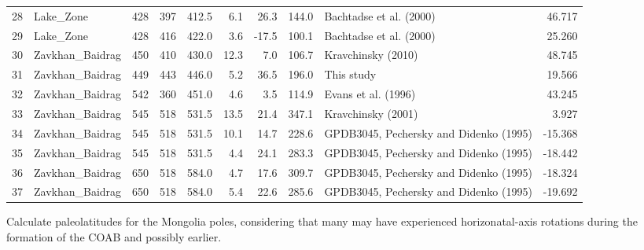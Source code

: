 \documentclass[11pt]{article}
\begin{document}
{\begin{tabular}{llrrrrrrlr}
28 &          Lake\_Zone &       428 &      397 &       412.5 &   6.1 &  26.3 &  144.0 &                 Bachtadse et al. (2000) &    46.717 \\
29 &          Lake\_Zone &       428 &      416 &       422.0 &   3.6 & -17.5 &  100.1 &                 Bachtadse et al. (2000) &    25.260 \\
30 &    Zavkhan\_Baidrag &       450 &      410 &       430.0 &  12.3 &   7.0 &  106.7 &                      Kravchinsky (2010) &    48.745 \\
31 &    Zavkhan\_Baidrag &       449 &      443 &       446.0 &   5.2 &  36.5 &  196.0 &                              This study &    19.566 \\
32 &    Zavkhan\_Baidrag &       542 &      360 &       451.0 &   4.6 &   3.5 &  114.9 &                     Evans et al. (1996) &    43.245 \\
33 &    Zavkhan\_Baidrag &       545 &      518 &       531.5 &  13.5 &  21.4 &  347.1 &                      Kravchinsky (2001) &     3.927 \\
34 &    Zavkhan\_Baidrag &       545 &      518 &       531.5 &  10.1 &  14.7 &  228.6 &  GPDB3045, Pechersky and Didenko (1995) &   -15.368 \\
35 &    Zavkhan\_Baidrag &       545 &      518 &       531.5 &   4.4 &  24.1 &  283.3 &  GPDB3045, Pechersky and Didenko (1995) &   -18.442 \\
36 &    Zavkhan\_Baidrag &       650 &      518 &       584.0 &   4.7 &  17.6 &  309.7 &  GPDB3045, Pechersky and Didenko (1995) &   -18.324 \\
37 &    Zavkhan\_Baidrag &       650 &      518 &       584.0 &   5.4 &  22.6 &  285.6 &  GPDB3045, Pechersky and Didenko (1995) &   -19.692 \\
\bottomrule
\end{tabular}}

    


    Calculate paleolatitudes for the Mongolia poles, considering that many
may have experienced horizonatal-axis rotations during the formation of
the COAB and possibly earlier.



    \begin{center}
    \end{center}
    { \hspace*{\fill} \\}
    
\end{document}
